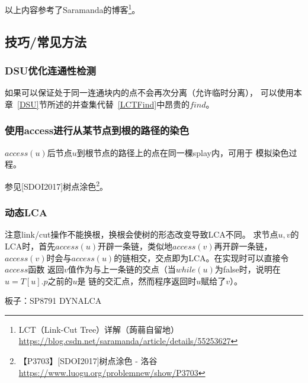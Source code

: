 以上内容参考了Saramanda的博客\footnote{
    LCT（Link-Cut Tree）详解（蒟蒻自留地）
    \url{https://blog.csdn.net/saramanda/article/details/55253627}}。

\subsection{技巧/常见方法}
\subsubsection{DSU优化连通性检测}
如果可以保证处于同一连通块内的点不会再次分离（允许临时分离），
可以使用本章~\ref{DSU}节所述的并查集代替~\ref{LCTFind}中昂贵的$find$。
\subsubsection{使用access进行从某节点到根的路径的染色}
$access(u)$后节点$u$到根节点的路径上的点在同一棵splay内，可用于
模拟染色过程。

参见[SDOI2017]树点涂色\footnote{【P3703】[SDOI2017]树点涂色 - 洛谷
    \url{https://www.luogu.org/problemnew/show/P3703}}。
\subsubsection{动态LCA}
注意link/cut操作不能换根，换根会使树的形态改变导致LCA不同。
求节点$u,v$的LCA时，首先$access(u)$开辟一条链，类似地$access(v)$再开辟一条链，
$access(v)$时会与$access(u)$的链相交，交点即为LCA。在实现时可以直接令$access$函数
返回$v$值作为与上一条链的交点（当$while(u)$为false时，说明在$u=T[u].p$之前的$u$是
链的交汇点，然而程序返回时$u$赋给了$v$）。

板子：SP8791 DYNALCA

